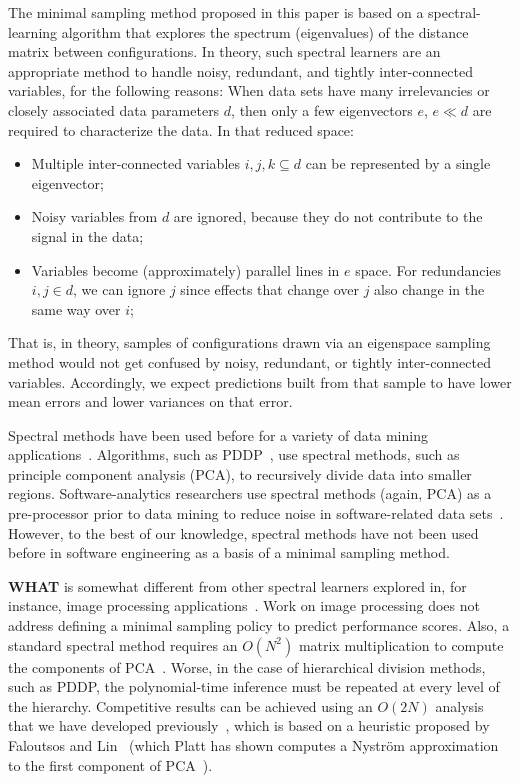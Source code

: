 \documentclass{newsig}
\newcommand{\what}{{\bf WHAT }}
\begin{document}
The minimal sampling method proposed in this paper is based on a spectral-learning algorithm
that  explores the spectrum (eigenvalues) of the distance matrix between  configurations.
In theory, such spectral learners are an appropriate method to handle noisy, redundant, and tightly inter-connected variables, for the following reasons:
When data sets have many irrelevancies or closely associated data parameters $d$, then
only a few eigenvectors $e$, $e \ll d$  are required to characterize the data.
In that reduced space:
\begin{itemize}
\item
Multiple inter-connected variables $i,j,k \subseteq d$ can be represented
by a single eigenvector;
\item
Noisy variables from $d$ are
ignored, because they  do not contribute to the signal in the data;
\item
Variables  become (approximately) parallel lines
in $e$ space. For  redundancies \mbox{$i,j \in d$}, we
can ignore $j$
since effects that change over $j$ also
change in the same way over $i$;
\end{itemize}
That is, in theory, samples of configurations drawn via an eigenspace sampling method
would not get confused by noisy, redundant, or tightly inter-connected variables. Accordingly,
we expect predictions built from that sample to have  lower mean errors and lower variances on that error.

Spectral methods have been used before for a variety of data mining applications~\cite{kamvar2003spectral}.
Algorithms, such as PDDP~\cite{boley98}, use spectral methods, such as principle component analysis (PCA), to
recursively divide data into smaller regions.  Software-analytics researchers use spectral methods (again, PCA) as a pre-processor prior to data mining  to reduce noise in software-related data sets~\cite{theisen2015approximating}.
However, to the best of our knowledge, spectral methods have not been used before in software engineering as a basis of a minimal sampling method.


\what is somewhat different from other spectral
learners explored in, for instance, image processing applications~\cite{shi00}.
Work on image processing does not address
defining a minimal sampling policy to predict performance scores.
Also, a standard spectral method requires an $O(N^2)$ matrix multiplication to compute the components
of PCA~\cite{ilin10}. Worse, in the case of hierarchical division methods, such as PDDP,
the polynomial-time inference must be repeated at every level of the hierarchy.
Competitive results can be achieved
using an $O(2N)$ analysis that we have developed previously~\cite{me12d}, which is  based on  a heuristic proposed by Faloutsos and Lin~\cite{Faloutsos1995} (which Platt has shown computes a Nystr\"om approximation to the first component of PCA~\cite{platt05}).
\end{document}

